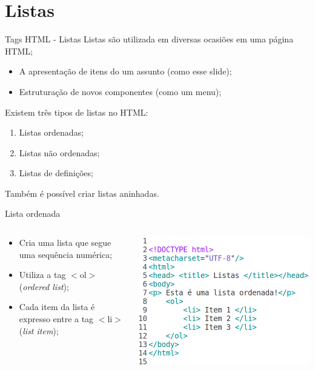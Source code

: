 \documentclass{beamer}
\begin{document}
\section{Listas}
\begin{frame}{Tags HTML - Listas}
  Listas são utilizada em diversas ocasiões em uma página HTML;
  \begin{itemize}
   \item A apresentação de itens do um assunto (como esse slide);
   \item Estruturação de novos componentes (como um menu);
  \end{itemize}
   Existem três tipos de listas no HTML:
  \begin{enumerate}
   \item Listas ordenadas;
    \item Listas não ordenadas;
    \item Listas de definições;
 \end{enumerate}
 Também é possível criar listas aninhadas.
\end{frame}
\begin{frame}{Lista ordenada}
  \begin{columns}
    \begin{column}{0.45 \textwidth}
     \begin{itemize}
      \item Cria uma lista que segue uma sequência numérica;
       \item Utiliza a tag $<$ol$>$ (\textit{ordered list});
       \item Cada item da lista é expresso entre a tag $<$li$>$ 
      (\textit{list item});
     \end{itemize}
    \end{column}
    \begin{column}{0.5\textwidth}
     \includegraphics[height=0.45\paperheight]{fig/aula2/html2.png}
    \end{column}
  \end{columns}
\end{frame}
\end{document}
